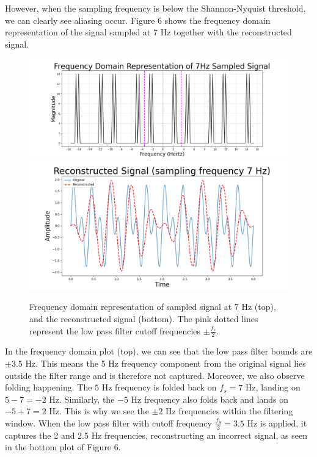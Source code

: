 \documentclass{article}
\begin{document}
However, when the sampling frequency is below the Shannon-Nyquist threshold, we can clearly see aliasing occur.
Figure 6 shows the frequency domain representation of the signal sampled at 7 Hz together with the reconstructed signal.

\begin{figure}[H]
    \centering
    \begin{minipage}{\textwidth}
        \centering
        \includegraphics[width=\linewidth]{images/pink_freqdom_7hz.png}
        \includegraphics[width=\linewidth]{images/ogcolors_reconstructed_7hz.png}
        \\[0.5em] 
    \end{minipage}
    \caption{Frequency domain representation of sampled signal at 7 Hz (top), and the reconstructed signal (bottom). 
    The pink dotted lines represent the low pass filter cutoff frequencies $\pm \frac{f_s}{2}$.}
\end{figure}

In the frequency domain plot (top), we can see that the low pass filter bounds are $\pm 3.5$ Hz.
This means the 5 Hz frequency component from the original signal lies outside the filter range and is therefore not captured.
Moreover, we also observe folding happening. The $5$ Hz frequency is folded back on $f_s = 7$ Hz, landing on $5-7=-2$ Hz. 
Similarly, the $-5$ Hz frequency also folds back and lands on $-5+7=2$ Hz. This is why we see the $\pm 2$ Hz frequencies within the filtering window.
When the low pass filter with cutoff frequency $\frac{f_S}{2} = 3.5$ Hz is applied, it captures the 2 and 2.5 Hz frequencies, reconstructing an incorrect signal, as seen in the bottom plot of Figure 6.
\end{document}
